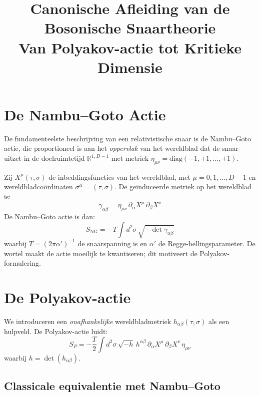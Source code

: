 \documentclass[12pt,a4paper]{article}
\title{\textbf{Canonische Afleiding van de Bosonische Snaartheorie}\\
\large Van Polyakov-actie tot Kritieke Dimensie}
\author{}
\date{}
\begin{document}
\maketitle
\tableofcontents
\newpage

\section{De Nambu--Goto Actie}

De fundamenteelste beschrijving van een relativistische snaar is de Nambu--Goto actie, die proportioneel is aan het \emph{oppervlak} van het wereldblad dat de snaar uitzet in de doelruimtetijd $\mathbb{R}^{1,D-1}$ met metriek $\eta_{\mu\nu} = \mathrm{diag}(-1,+1,\dots,+1)$.

Zij $X^\mu(\tau,\sigma)$ de inbeddingsfuncties van het wereldblad, met $\mu = 0,1,\dots,D-1$ en wereldbladco\"ordinaten $\sigma^\alpha = (\tau,\sigma)$. De ge\"induceerde metriek op het wereldblad is:
\begin{equation}
  \gamma_{\alpha\beta} = \eta_{\mu\nu}\,\partial_\alpha X^\mu\,\partial_\beta X^\nu
\end{equation}
De Nambu--Goto actie is dan:
\begin{equation}
  S_{\mathrm{NG}} = -T \int d^2\sigma\,\sqrt{-\det\gamma_{\alpha\beta}}
  \label{eq:NG}
\end{equation}
waarbij $T = (2\pi\alpha')^{-1}$ de snaarspanning is en $\alpha'$ de Regge-hellingsparameter. De wortel maakt de actie moeilijk te kwantiseren; dit motiveert de Polyakov-formulering.

\section{De Polyakov-actie}

We introduceren een \emph{onafhankelijke} wereldbladmetriek $h_{\alpha\beta}(\tau,\sigma)$ als een hulpveld. De Polyakov-actie luidt:
\begin{equation}
  S_P = -\frac{T}{2}\int d^2\sigma\,\sqrt{-h}\,h^{\alpha\beta}\,\partial_\alpha X^\mu\,\partial_\beta X^\nu\,\eta_{\mu\nu}
  \label{eq:Polyakov}
\end{equation}
waarbij $h = \det(h_{\alpha\beta})$.

\subsection{Classicale equivalentie met Nambu--Goto}
\end{document}
